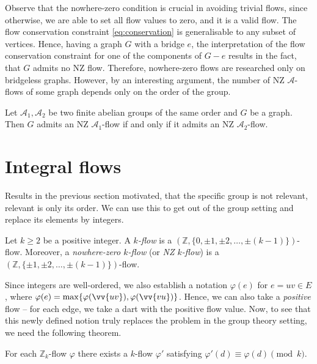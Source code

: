 Observe that the nowhere-zero condition is crucial in avoiding trivial flows, since otherwise, we are able to set all flow values to zero, and it is a valid flow. The flow conservation constraint \eqref{eq:conservation} is generalisable to any subset of vertices. Hence, having a graph $G$ with a bridge $e$, the interpretation of the flow conservation constraint for one of the components of $G - e$ results in the fact, that $G$ admits no NZ flow. Therefore, nowhere-zero flows are researched only on bridgeless graphs. However, by an interesting argument, the number of NZ $\mathcal A$-flows of some graph depends only on the order of the group.

\begin{theorem} \emph{\cite[p. 82]{tutte}}
Let $\mathcal A_1, \mathcal A_2$ be two finite abelian groups of the same order and $G$ be a graph. Then $G$ admits an NZ $\mathcal A_1$-flow if and only if it admits an NZ $\mathcal A_2$-flow.
\end{theorem}

\section{Integral flows}

Results in the previous section motivated, that the specific group is not relevant, relevant is only its order. We can use this to get out of the group setting and replace its elements by integers.

\begin{definition}
Let $k\geq 2$ be a positive integer. A \emph{$k$-flow} is a $(\mathbb Z, \{0,\pm 1, \pm 2, \dots, \pm (k-1)\})$-flow. Moreover, a \emph{nowhere-zero $k$-flow} (or \emph{NZ $k$-flow}) is a $(\mathbb Z, \{\pm 1, \pm 2, \dots, \pm (k-1)\})$-flow.
\end{definition}

Since integers are well-ordered, we also establish a notation $\varphi(e)$ for $e=uv\in E$, where $\varphi(e) = \max\{\varphi(\vv{uv}), \varphi(\vv{vu})\}$. Hence, we can also take a \emph{positive} flow -- for each edge, we take a dart with the positive flow value. Now, to see that this newly defined notion truly replaces the problem in the group theory setting, we need the following theorem.

\begin{theorem} \emph{\cite[p. 207]{jaeger1979flows}}
For each $\mathbb Z_k$-flow $\varphi$ there exists a $k$-flow $\varphi'$ satisfying $\varphi'\left(d\right)\equiv\varphi\left(d\right)\pmod{k}$. \label{th:finite_group_flows}
\end{theorem}

